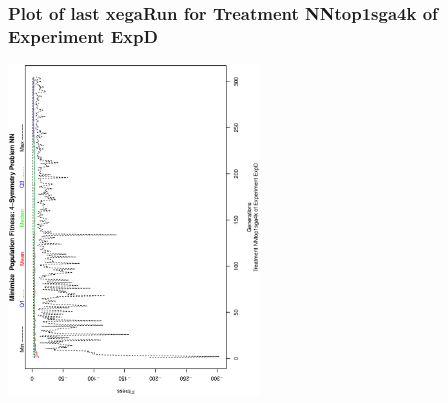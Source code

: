  \begin{frame}
 \frametitle{ Plot of last xegaRun for Treatment NNtop1sga4k of Experiment ExpD }
 \begin{center}
\includegraphics[width=0.5\textwidth, angle=-90]
{ExpDPlotPopStatsFigure002.eps}
 \end{center}
 \label{report/ExpDPlotPopStatsFigure002.eps}  
 \end{frame}

